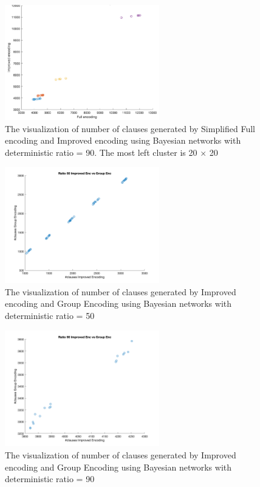 \begin{figure}
    \centering
    \includegraphics[width = 0.6\textwidth]{pic/r90_unscaled_clauses.png}
    \caption{The visualization of number of clauses generated by Simplified Full encoding and Improved encoding using Bayesian networks with deterministic ratio = 90. The most left cluster is 20 $\times$ 20}
    \label{fig:clauses_compare_1v2_r90}
\end{figure}

\begin{figure}
    \centering
    \includegraphics[width = 0.6\textwidth]{pic/r50_enc2v3.png}
    \caption{The visualization of number of clauses generated by Improved encoding and Group Encoding using Bayesian networks with deterministic ratio = 50}
    \label{fig:clauses_compare_2v3_r50}
\end{figure}

\begin{figure}
    \centering
    \includegraphics[width = 0.6\textwidth]{pic/r90_enc2v3.png}
    \caption{The visualization of number of clauses generated by Improved encoding and Group Encoding using Bayesian networks with deterministic ratio = 90}
    \label{fig:clauses_compare_2v3_r90}
\end{figure}

